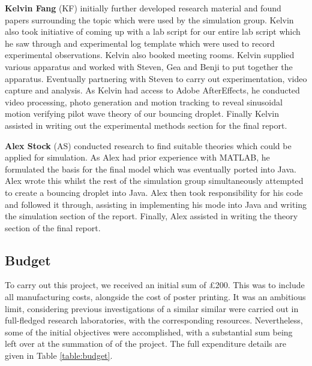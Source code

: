 \textbf{Kelvin Fang} (KF) initially further developed research material and found papers surrounding the topic which were used by the simulation group. Kelvin also took initiative of coming up with a lab script for our entire lab script which he saw through and experimental log template which were used to record experimental observations. Kelvin also booked meeting rooms. Kelvin supplied various apparatus and worked with Steven, Gea and Benji to put together the apparatus. Eventually partnering with Steven to carry out experimentation, video capture and analysis. As Kelvin had access to Adobe AfterEffects, he conducted video processing, photo generation and motion tracking to reveal sinusoidal motion verifying pilot wave theory of our bouncing droplet. Finally Kelvin assisted in writing out the experimental methods section for the final report.

\textbf{Alex Stock} (AS) conducted research to find suitable theories which could be applied for simulation. As Alex had prior experience with MATLAB, he formulated the basis for the final model which was eventually ported into Java. Alex wrote this whilst the rest of the simulation group simultaneously attempted to create a bouncing droplet into Java. Alex then took responsibility for his code and followed it through, assisting in implementing his mode into Java and writing the simulation section of the report. Finally, Alex assisted in writing the theory section of the final report.


\subsection{Budget}
To carry out this project, we received an initial sum of \pounds200. This was to include all manufacturing costs, alongside the cost of poster printing. It was an ambitious limit, considering previous investigations of a similar similar were carried out in full-fledged research laboratories, with the corresponding resources. Nevertheless, some of the initial objectives were accomplished, with a substantial sum being left over at the summation of of the project. The full expenditure details are given in Table \ref{table:budget}. 

